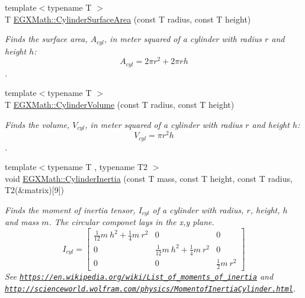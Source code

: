 \begin{DoxyCompactItemize}
\item 
{\footnotesize template$<$typename T $>$ }\\T \mbox{\hyperlink{group___e_g_x_math-_geometry-3_d-_cylinder_gaf14619f5d525e14150a43b9898adb258}{E\+G\+X\+Math\+::\+Cylinder\+Surface\+Area}} (const T radius, const T height)
\begin{DoxyCompactList}\small\item\em Finds the surface area, $A_{cyl}$, in meter squared of a cylinder with radius $r$ and height $h$\+: \[ A_{cyl}=2\pi r^2 + 2\pi r h \]. \end{DoxyCompactList}\item 
{\footnotesize template$<$typename T $>$ }\\T \mbox{\hyperlink{group___e_g_x_math-_geometry-3_d-_cylinder_ga9d1aa08f778f9ccbd79953063f11bc9b}{E\+G\+X\+Math\+::\+Cylinder\+Volume}} (const T radius, const T height)
\begin{DoxyCompactList}\small\item\em Finds the volume, $V_{cyl}$, in meter squared of a cylinder with radius $r$ and height $h$\+: \[ V_{cyl}=\pi r^2 h\]. \end{DoxyCompactList}\item 
{\footnotesize template$<$typename T , typename T2 $>$ }\\void \mbox{\hyperlink{group___e_g_x_math-_geometry-3_d-_cylinder_gae7dca080058b400feb0d69f78af7a850}{E\+G\+X\+Math\+::\+Cylinder\+Inertia}} (const T mass, const T height, const T radius, T2(\&matrix)\mbox{[}9\mbox{]})
\begin{DoxyCompactList}\small\item\em Finds the moment of inertia tensor, $I_{cyl}$ of a cylinder with radius, $r$, height, $h$ and mass $m$. The circular componet lays in the x,y plane. \[ I_{cyl}=\begin{bmatrix} \frac{1}{12}m\ h^2 + \frac{1}{4}m\ r^2 & 0 & 0\\ 0 & \frac{1}{12}m\ h^2 + \frac{1}{4}m\ r^2 & 0\\ 0 & 0 & \frac{1}{2}m\ r^2 \end{bmatrix} \] See \href{https://en.wikipedia.org/wiki/List_of_moments_of_inertia}{\tt https\+://en.\+wikipedia.\+org/wiki/\+List\+\_\+of\+\_\+moments\+\_\+of\+\_\+inertia} and \href{http://scienceworld.wolfram.com/physics/MomentofInertiaCylinder.html}{\tt http\+://scienceworld.\+wolfram.\+com/physics/\+Momentof\+Inertia\+Cylinder.\+html}. \end{DoxyCompactList}\item 

\end{DoxyCompactItemize}
